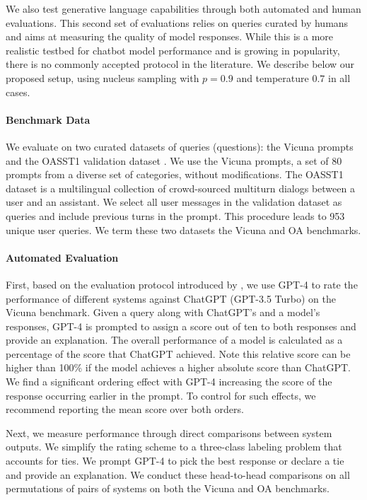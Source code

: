 We also test generative language capabilities through both automated and human evaluations. This second set of evaluations relies on queries curated by humans and aims at measuring the quality of model responses. While this is a more realistic testbed for chatbot model performance and is growing in popularity, there is no commonly accepted protocol in the literature. We describe below our proposed setup, using nucleus sampling with $p=0.9$ and temperature $0.7$ in all cases.

\paragraph{Benchmark Data} We evaluate on two curated datasets of queries (questions): the Vicuna prompts \citep{vicuna2023} and the OASST1 validation dataset \citep{kopf2023openassistant}. We use the Vicuna prompts, a set of 80 prompts from a diverse set of categories, without modifications. The OASST1 dataset is a multilingual collection of crowd-sourced multiturn dialogs between a user and an assistant. We select all user messages in the validation dataset as queries and include previous turns in the prompt. This procedure leads to 953 unique user queries. We term these two datasets the Vicuna and OA benchmarks.

\paragraph{Automated Evaluation} First, based on the evaluation protocol introduced by \citet{vicuna2023}, we use GPT-4 to rate the performance of different systems against ChatGPT (GPT-3.5 Turbo) on the Vicuna benchmark. Given a query along with ChatGPT's and a model's responses, GPT-4 is prompted to assign a score out of ten to both responses and provide an explanation. The overall performance of a model is calculated as a percentage of the score that ChatGPT achieved. Note this relative score can be higher than 100\% if the model achieves a higher absolute score than ChatGPT. We find a significant ordering effect with GPT-4 increasing the score of the response occurring earlier in the prompt. To control for such effects, we recommend reporting the mean score over both orders.

Next, we measure performance through direct comparisons between system outputs. We simplify the rating scheme to a three-class labeling problem that accounts for ties. We prompt GPT-4 to pick the best response or declare a tie and provide an explanation. We conduct these head-to-head comparisons on all permutations of pairs of systems on both the Vicuna and OA benchmarks.

